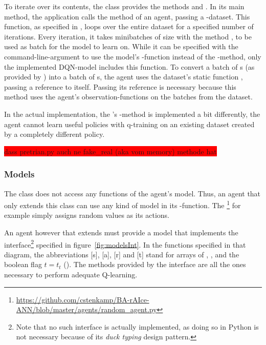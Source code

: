 To iterate over its contents, the class  provides the methods  and . In its main method, the application  calls the method  of an agent, passing a -dataset. This function, as specified in , loops over the entire dataset for a specified number of iterations. Every iteration, it takes minibatches of size  with the method , to be used as batch for the model to learn on. While it can be specified with the command-line-argument  to use the model's -function instead of the -method, only the implemented DQN-model includes this function. To convert a batch of s (as provided by ) into a batch of s, the agent uses the dataset's static function , passing a reference to itself. Passing its reference is necessary because this method uses the agent's observation-functions on the batches from the dataset.

In the actual implementation, the 's -method is implemented a bit differently, the agent cannot learn useful policies with q-training on an existing dataset created by a completely different policy.


\colorbox{red}{dass pretrian.py auch ne fake\_real (aka vom memory) methode hat}


\subsubsection{Models}

The class  does not access any functions of the agent's model. Thus, an agent that only extends this class can use any kind of model in its -function. The \footnote{\url{https://github.com/cstenkamp/BA-rAIce-ANN/blob/master/agents/random\_agent.py}} for example simply assigns random values as its actions.

An agent however that extends  must provide a model that implements the interface\footnote{Note that no such interface is actually implemented, as doing so in Python is not necessary because of its \textit{duck typing} design pattern.} specified in figure~\ref{fig:modelsInt}. In the functions specified in that diagram, the abbreviations [s], [a], [r] and [t] stand for arrays of , ,  and the boolean flag $t = t_t$ (). The methods provided by the interface are all the ones necessary to perform adequate Q-learning.

